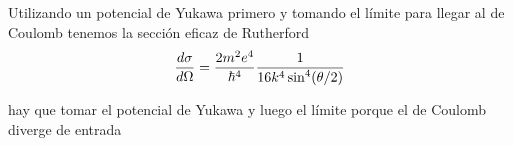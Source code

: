 \documentclass[10pt,oneside]{CBFT_book}
\begin{document}
Utilizando un potencial de Yukawa primero y tomando el límite para llegar al de Coulomb tenemos la sección 
eficaz de Rutherford 
\[
	\frac{d^{\hspace{-0.05em}} {\sigma}}{d {\Omega}^{\hspace{-0.05em}}} = \frac{2m^2e^4}{\hbar^4}\frac{1}{16k^4\sin^4(\theta/2)}
\]

hay que tomar el potencial de Yukawa y luego el límite porque el de Coulomb diverge de entrada



\end{document}
